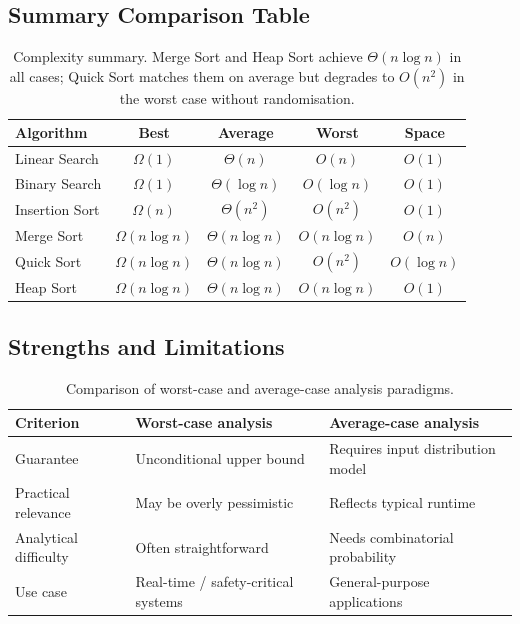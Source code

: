 \documentclass[11pt,a4paper]{article}
\begin{document}
\subsection{Summary Comparison Table}
\begin{table}[h]
\centering
\begin{tabular}{@{}lcccc@{}}
\toprule
\textbf{Algorithm} & \textbf{Best} & \textbf{Average} & \textbf{Worst} & \textbf{Space}\\
\midrule
Linear Search  & $\Omega(1)$       & $\Theta(n)$       & $O(n)$       & $O(1)$ \\
Binary Search  & $\Omega(1)$       & $\Theta(\log n)$  & $O(\log n)$  & $O(1)$ \\
Insertion Sort & $\Omega(n)$       & $\Theta(n^2)$     & $O(n^2)$     & $O(1)$ \\
Merge Sort     & $\Omega(n\log n)$ & $\Theta(n\log n)$ & $O(n\log n)$ & $O(n)$ \\
Quick Sort     & $\Omega(n\log n)$ & $\Theta(n\log n)$ & $O(n^2)$     & $O(\log n)$ \\
Heap Sort      & $\Omega(n\log n)$ & $\Theta(n\log n)$ & $O(n\log n)$ & $O(1)$ \\
\bottomrule
\end{tabular}
\caption{Complexity summary. Merge Sort and Heap Sort achieve $\Theta(n\log n)$
in all cases; Quick Sort matches them on average but degrades to $O(n^2)$ in the
worst case without randomisation.}
\label{tab:comparison}
\end{table}

\subsection{Strengths and Limitations}
\begin{table}[h]
\centering
\begin{tabular}{@{}lll@{}}
\toprule
\textbf{Criterion}    & \textbf{Worst-case analysis}          & \textbf{Average-case analysis} \\
\midrule
Guarantee             & Unconditional upper bound             & Requires input distribution model \\
Practical relevance   & May be overly pessimistic             & Reflects typical runtime \\
Analytical difficulty & Often straightforward                 & Needs combinatorial probability \\
Use case              & Real-time / safety-critical systems   & General-purpose applications \\
\bottomrule
\end{tabular}
\caption{Comparison of worst-case and average-case analysis paradigms.}
\end{table}
\end{document}
